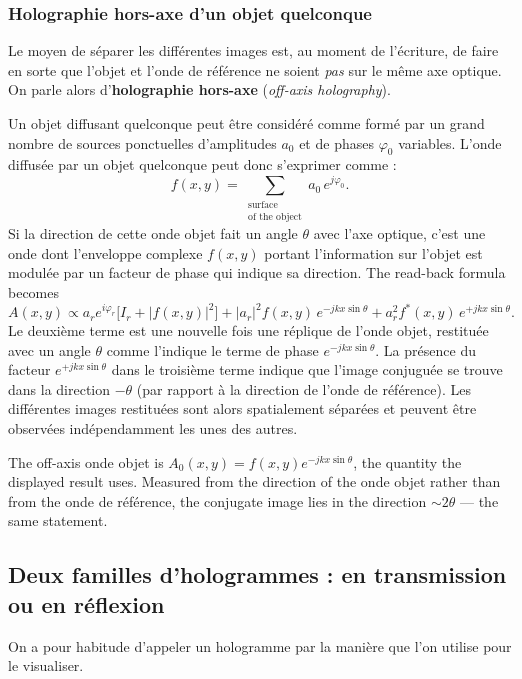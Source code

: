 \subsubsection{Holographie hors-axe d'un objet quelconque}
Le moyen de séparer les différentes images est, au moment de l'écriture, de
faire en sorte que l'objet et l'onde de référence ne soient \emph{pas} sur le
même axe optique. On parle alors d'\textbf{holographie hors-axe}
(\textit{off-axis holography}).

Un objet diffusant quelconque peut être considéré comme formé par un grand
nombre de sources ponctuelles d'amplitudes $a_0$ et de phases $\varphi_0$
variables. L'onde diffusée par un objet quelconque peut donc s'exprimer comme :
\begin{equation*}
  f(x,y) = \sum_{\substack{\text{surface}\\ \text{of the object}}} a_0\,e^{j\varphi_0}.
\end{equation*}
Si la direction de cette onde objet fait un angle $\theta$ avec l'axe optique,
c'est une onde dont l'enveloppe complexe $f(x,y)$ portant l'information sur
l'objet est modulée par un facteur de phase qui indique sa direction. The
read-back formula becomes
\begin{equation*}
  A(x,y) \propto a_r e^{i\varphi_r}\Big[I_r + |f(x,y)|^2\Big]
  + |a_r|^2 f(x,y)\,e^{-jkx\sin\theta}
  + a_r^2 f^{*}(x,y)\,e^{+jkx\sin\theta}.
\end{equation*}
Le deuxième terme est une nouvelle fois une réplique de l'onde objet, restituée
avec un angle $\theta$ comme l'indique le terme de phase $e^{-jkx\sin\theta}$.
La présence du facteur $e^{+jkx\sin\theta}$ dans le troisième terme indique que
l'image conjuguée se trouve dans la direction $-\theta$ (par rapport à la
direction de l'onde de référence). Les différentes images restituées sont alors
spatialement séparées et peuvent être observées indépendamment les unes des
autres.

\begin{remark}
  The off-axis onde objet is $A_0(x,y)=f(x,y)e^{-jkx\sin\theta}$, the quantity
  the displayed result uses. Measured from the direction of the onde objet
  rather than from the onde de référence, the conjugate image lies in the
  direction ${\sim}2\theta$ --- the same statement.
\end{remark}

\subsection{Deux familles d'hologrammes : en transmission ou en réflexion}
On a pour habitude d'appeler un hologramme par la manière que l'on utilise pour
le visualiser.

